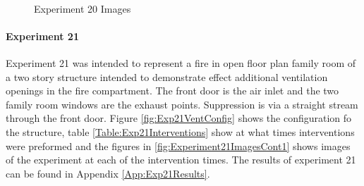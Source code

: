 \documentclass{article}
\begin{document}
\begin{figure}[H]
	\ContinuedFloat 
	\centering 
	 \ 
	\caption{Experiment 20 Images}
	\label{fig:Experiment20ImagesCont3} 
\end{figure}

\paragraph{Experiment 21}\mbox{}

Experiment 21 was intended to represent a fire in open floor plan family room of a two story structure intended to demonstrate effect additional ventilation openings in the fire compartment. The front door is the air inlet and the two family room windows are the exhaust points. Suppression is via a straight stream through the front door. Figure \ref{fig:Exp21VentConfig} shows the configuration fo the structure, table \ref{Table:Exp21Interventions} show at what times interventions were preformed and the figures in \ref{fig:Experiment21ImagesCont1} shows images of the experiment at each of the intervention times. The results of experiment 21 can be found in Appendix \ref{App:Exp21Results}.
\end{document}
